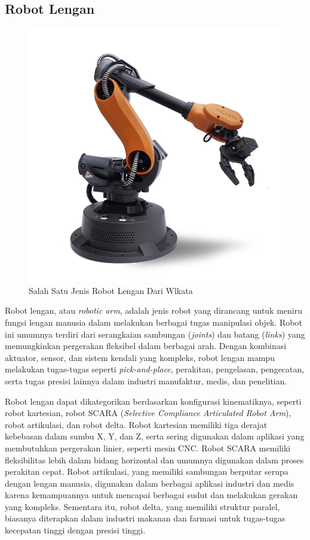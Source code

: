 \subsection{Robot Lengan}

\begin{figure} [H] \centering
  \includegraphics[scale=0.25]{gambar/arm_robot.png}
  \caption{Salah Satu Jenis Robot Lengan Dari Wlkata}
  \label{fig:arm_robot}
\end{figure}
Robot lengan, atau \emph{robotic arm}, adalah jenis robot yang dirancang untuk meniru fungsi lengan manusia
dalam melakukan berbagai tugas manipulasi objek. Robot ini umumnya terdiri dari serangkaian sambungan (\emph{joints})
dan batang (\emph{links}) yang memungkinkan pergerakan fleksibel dalam berbagai arah. Dengan kombinasi aktuator,
sensor, dan sistem kendali yang kompleks, robot lengan mampu melakukan tugas-tugas seperti \emph{pick-and-place},
perakitan, pengelasan, pengecatan, serta tugas presisi lainnya dalam industri manufaktur, medis, dan penelitian.

Robot lengan dapat dikategorikan berdasarkan konfigurasi kinematiknya, seperti robot kartesian,
robot SCARA (\emph{Selective Compliance Articulated Robot Arm}), robot artikulasi, dan robot delta.
Robot kartesian memiliki tiga derajat kebebasan dalam sumbu X, Y, dan Z, serta sering digunakan
dalam aplikasi yang membutuhkan pergerakan linier, seperti mesin CNC. Robot SCARA memiliki fleksibilitas
lebih dalam bidang horizontal dan umumnya digunakan dalam proses perakitan cepat. Robot artikulasi,
yang memiliki sambungan berputar serupa dengan lengan manusia, digunakan dalam berbagai aplikasi industri
dan medis karena kemampuannya untuk mencapai berbagai sudut dan melakukan gerakan yang kompleks.
Sementara itu, robot delta, yang memiliki struktur paralel, biasanya diterapkan dalam industri makanan
dan farmasi untuk tugas-tugas kecepatan tinggi dengan presisi tinggi.

